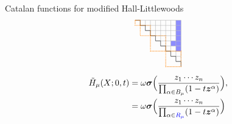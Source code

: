\documentclass[dvipsnames]{beamer}
\newcommand{\zz}{{\boldsymbol z}}
\newcommand{\sigmabold}{\boldsymbol \sigma}
\newcommand{\Htild}{\tilde{H}}
\theoremstyle{definition}
\newcommand{\qtrootcolor}{blue!45}
\newcommand{\colorb}[1]{\textcolor{blue}{#1}}
\begin{document}
\begin{frame}{Catalan functions for modified Hall-Littlewoods}
\begin{align*}
\begin{tikzpicture}[scale=.213]
 \draw[draw = none, fill = \qtrootcolor] (8,-5) rectangle (9,-6);
 \draw[draw = none, fill = \qtrootcolor] (9,-1) rectangle (10,-2);
 \draw[draw = none, fill = \qtrootcolor] (9,-2) rectangle (10,-3);
 \draw[draw = none, fill = \qtrootcolor] (9,-3) rectangle (10,-4);
 \draw[draw = none, fill = \qtrootcolor] (9,-4) rectangle (10,-5);
 \draw[draw = none, fill = \qtrootcolor] (9,-5) rectangle (10,-6);
 \draw[draw = none, fill = \qtrootcolor] (9,-6) rectangle (10,-7);
 \draw[thin, black!31] (1,-1) -- (10,-1);
\draw[thin, black!31] (2,-1) -- (2,-1);
\draw[thin, black!31] (2,-2) -- (10,-2);
\draw[thin, black!31] (3,-2) -- (3,-1);
\draw[thin, black!31] (3,-3) -- (10,-3);
\draw[thin, black!31] (4,-3) -- (4,-1);
\draw[thin, black!31] (4,-4) -- (10,-4);
\draw[thin, black!31] (5,-4) -- (5,-1);
\draw[thin, black!31] (5,-5) -- (10,-5);
\draw[thin, black!31] (6,-5) -- (6,-1);
\draw[thin, black!31] (6,-6) -- (10,-6);
\draw[thin, black!31] (7,-6) -- (7,-1);
\draw[thin, black!31] (7,-7) -- (10,-7);
\draw[thin, black!31] (8,-7) -- (8,-1);
\draw[thin, black!31] (8,-8) -- (10,-8);
\draw[thin, black!31] (9,-8) -- (9,-1);
\draw[thin, black!31] (9,-9) -- (10,-9);
\draw[thin, black!31] (10,-9) -- (10,-1);
 \draw[thin] (1,-1) -- (2,-1);
\draw[thin] (2,-1) -- (2,-2);
\draw[thin] (2,-2) -- (3,-2);
\draw[thin] (3,-2) -- (3,-3);
\draw[thin] (3,-3) -- (4,-3);
\draw[thin] (4,-3) -- (4,-4);
\draw[thin] (4,-4) -- (5,-4);
\draw[thin] (5,-4) -- (5,-5);
\draw[thin] (5,-5) -- (6,-5);
\draw[thin] (6,-5) -- (6,-6);
\draw[thin] (6,-6) -- (7,-6);
\draw[thin] (7,-6) -- (7,-7);
\draw[thin] (7,-7) -- (8,-7);
\draw[thin] (8,-7) -- (8,-8);
\draw[thin] (8,-8) -- (9,-8);
\draw[thin] (9,-8) -- (9,-9);
\draw[thin] (9,-9) -- (10,-9);
\draw[thin] (10,-9) -- (10,-10);
\draw[thick, densely dotted, orange] (1,-1) rectangle (2,-2);
\draw[thick, densely dotted, orange] (2,-2) rectangle (4,-4);
\draw[thick, densely dotted, orange] (4,-4) rectangle (7,-7);
\draw[thick, densely dotted, orange] (7,-7) rectangle (10,-10);
\end{tikzpicture}
\end{align*}
\vspace{-0.5cm}
\pause
 \begin{align*}
\Htild_\mu(X;0,t) & = \omega \sigmabold
\Big( \frac{z_1\cdots z_n}{\prod_{\alpha \in
B_\mu}(1 - t \zz^\alpha)} 
                    \Big),\\
   & =
 \omega \sigmabold
\Big( \frac{z_1\cdots z_n}{\prod_{\alpha \in
\colorb{R_\mu}}(1 - t \zz^\alpha)} 
                    \Big)
\end{align*}
\end{frame}
\end{document}
